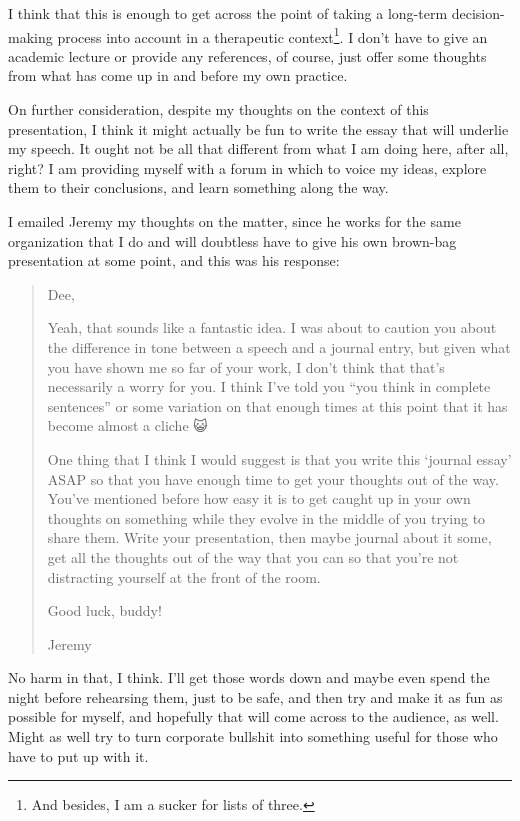 I think that this is enough to get across the point of taking a long-term decision-making process into account in a therapeutic context\footnote{And besides, I am a sucker for lists of three.}. I don't have to give an academic lecture or provide any references, of course, just offer some thoughts from what has come up in and before my own practice.

On further consideration, despite my thoughts on the context of this presentation, I think it might actually be fun to write the essay that will underlie my speech. It ought not be all that different from what I am doing here, after all, right? I am providing myself with a forum in which to voice my ideas, explore them to their conclusions, and learn something along the way.

I emailed Jeremy my thoughts on the matter, since he works for the same organization that I do and will doubtless have to give his own brown-bag presentation at some point, and this was his response:

\begin{quote}
\color{DarkSlateGray}
Dee,

Yeah, that sounds like a fantastic idea. I was about to caution you about the difference in tone between a speech and a journal entry, but given what you have shown me so far of your work, I don't think that that's necessarily a worry for you. I think I've told you ``you think in complete sentences'' or some variation on that enough times at this point that it has become almost a cliche {\SmileyFont 😺}

One thing that I think I would suggest is that you write this `journal essay' ASAP so that you have enough time to get your thoughts out of the way. You've mentioned before how easy it is to get caught up in your own thoughts on something while they evolve in the middle of you trying to share them. Write your presentation, then maybe journal about it some, get all the thoughts out of the way that you can so that you're not distracting yourself at the front of the room.

Good luck, buddy!

Jeremy
\end{quote}

No harm in that, I think. I'll get those words down and maybe even spend the night before rehearsing them, just to be safe, and then try and make it as fun as possible for myself, and hopefully that will come across to the audience, as well. Might as well try to turn corporate bullshit into something useful for those who have to put up with it.

